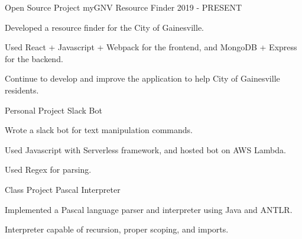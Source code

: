 

\begin{cventries}

\cventry
    {Open Source Project} %
    {myGNV Resource Finder} %
    {} %
    {2019 - PRESENT} %
    {
    \begin{cvitems} %
        \item {Developed a resource finder for the City of Gainesville.}
        \item {Used React + Javascript + Webpack for the frontend, and MongoDB + Express for the backend.}
        \item {Continue to develop and improve the application to help City of Gainesville residents.}
    \end{cvitems}
    }


  \cventry
    {Personal Project} %
    {Slack Bot} %
    {} %
    {} %
    {
      \begin{cvitems} %
        \item {Wrote a slack bot for text manipulation commands.}
        \item {Used Javascript with Serverless framework, and hosted bot on AWS Lambda.}
        \item {Used Regex for parsing.}
      \end{cvitems}
    }


  \cventry
    {Class Project} %
    {Pascal Interpreter} %
    {} %
    {} %
    {
      \begin{cvitems} %
        \item {Implemented a Pascal language parser and interpreter using Java and ANTLR.}
        \item {Interpreter capable of recursion, proper scoping, and imports.}
      \end{cvitems}
    }

\end{cventries}